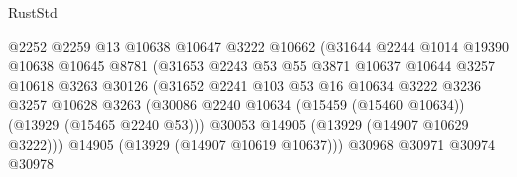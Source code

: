 \begin{lexlean}{RustStd}
\begin{coremodule}
                                        @2252
                                        @2259
                                        @13
                                        @10638
                                        @10647
                                        @3222
                                        @10662
                                        (@31644
                                          @2244
                                          @1014
                                          @19390
                                          @10638
                                          @10645
                                          @8781
                                          (@31653
                                            @2243
                                            @53
                                            @55
                                            @3871
                                            @10637
                                            @10644
                                            @3257
                                            @10618
                                            @3263
                                            @30126
                                            (@31652
                                              @2241
                                              @103
                                              @53
                                              @16
                                              @10634
                                              @3222
                                              @3236
                                              @3257
                                              @10628
                                              @3263
                                              (@30086
                                                @2240
                                                @10634
                                                (@15459 (@15460 @10634))
                                                (@13929 (@15465 @2240 @53)))
                                              @30053
                                              @14905
                                              (@13929 (@14907 @10629 @3222)))
                                            @14905
                                            (@13929 (@14907 @10619 @10637)))
                                          @30968
                                          @30971
                                          @30974
                                          @30978

\end{coremodule}
\end{lexlean}
